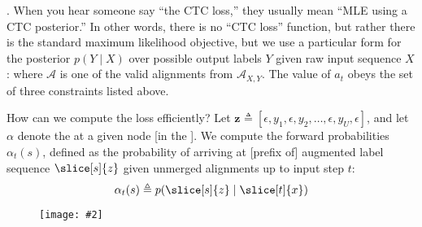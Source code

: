 \documentclass[11pt]{article}
\renewcommand\vec[2][]{\bm{#2}_{#1}}
\newcommand\myfig[2][0.3\textwidth]{\begin{figure}[h!]\centering\texttt{[image: \#2]}\end{figure}}
\newcommand\myspace[1][]{\vspace{#1\bigskipamount}}
\newcommand\p{\Needspace{10\baselineskip} \noindent}
\newcommand\bluesec[1]{\myspace \p \blue{#1}}
\begin{document}
\bluesec{Loss Function}. When you hear someone say ``the CTC loss,'' they usually mean ``MLE using a CTC posterior.'' In other words, there is no ``CTC loss'' function, but rather there is the standard maximum likelihood objective, but we use a particular form for the posterior $p(Y \mid X)$ over possible output labels $Y$ given raw input sequence $X$:
where $\mathcal A$ is one of the valid alignments from $\mathcal{A}_{X, Y}$. The value of $a_t$ obeys the set of three constraints listed above.

How can we compute the loss efficiently? Let $\vec z \triangleq [\epsilon, y_1, \epsilon, y_2, \ldots, \epsilon, y_U, \epsilon]$, and let $\alpha$ denote the  at a given node [in the ]. We compute the forward probabilities $\alpha_t(s)$, defined as the probability of arriving at [prefix of] augmented label sequence $\slice[s]{z}$ given unmerged alignments up to input step $t$:
$$
	\alpha_t(s) 
		\triangleq p(\slice[s]{z} \mid \slice[t]{x})
$$


\myfig[0.8\textwidth]{figs/ctc_distill.png}
\end{document}

